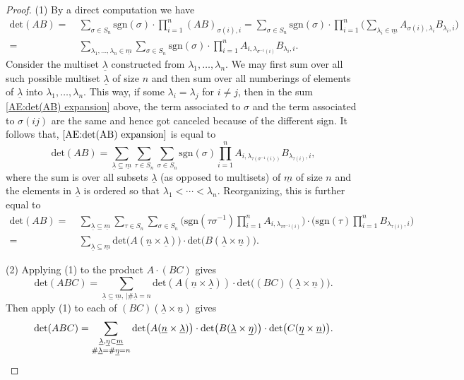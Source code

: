 \documentclass[12pt]{amsart}
\theoremstyle{definition}
\numberwithin{equation}{subsection}
\renewcommand{\det}{\mathrm{det}}
\newcommand{\sgn}{\mathrm{sgn}}
\begin{document}
\begin{proof}
(1) 
By a direct computation we have 
\begin{align}
\nonumber
\det(AB)=\ & \sum_{\sigma\in S_n}\sgn(\sigma)\cdot\prod_{i=1}^n (AB)_{\sigma(i),i}=\sum_{\sigma\in S_n}\sgn(\sigma)\cdot \prod_{i=1}^n\Big(\sum_{\lambda_i\in \underline m} A_{\sigma(i),\lambda_i}B_{\lambda_i,i} \Big)
\\
\label{AE:det(AB) expansion}
=\ & \sum_{\lambda_1, \dots, \lambda_n \in \underline m} \sum_{\sigma \in S_n} \sgn(\sigma)\cdot  \prod_{i=1}^nA_{i, \lambda_{\sigma^{-1}(i)}}B_{\lambda_i,i}.
\end{align}
Consider the multiset $\underline \lambda$ constructed from $\lambda_1, \dots, \lambda_n$. We may first sum over all such possible multiset $\underline \lambda$ of size $n$ and then sum over all numberings of elements of $\underline \lambda$ into $\lambda_1, \dots, \lambda_n$.  This way, if some $\lambda_i = \lambda_j$ for $i \neq j$, then in the sum \eqref{AE:det(AB) expansion} above, the term associated to $\sigma$ and the term associated to $\sigma(ij)$ are the same and hence got canceled because of the different sign.
It follows that, $\eqref{AE:det(AB) expansion}$ is equal to
$$
\det(AB) = \sum_{\underline\lambda \subseteq \underline m} \sum_{\tau \in S_n} \sum_{\sigma \in S_n} \sgn(\sigma)\prod_{i=1}^n A_{i, \lambda_{\tau(\sigma^{-1}(i))}} B_{\lambda_{\tau(i)},i},
$$
where the sum is over all subsets $\underline \lambda$ (as opposed to multisets) of $\underline m$ of size $n$ and the elements in $\underline \lambda$ is ordered so that $\lambda_1 < \cdots < \lambda_n$.  Reorganizing, this is further equal to
\begin{align*}
\det(AB) = \ &
\sum_{\underline\lambda\subseteq \underline m} \sum_{\tau \in S_n} \sum_{\sigma \in S_n} \Big(\sgn(\tau\sigma^{-1}) \prod_{i=1}^n A_{i, \lambda_{\tau\sigma^{-1}(i)}}\Big) \cdot \Big( \sgn(\tau)\prod_{i=1}^nB_{\lambda_{\tau(i)},i} \Big) \\
=\ & \sum_{\underline \lambda \subseteq \underline{m}}\det\big(A(\underline n \times \underline \lambda )\big) \cdot  \det\big(B(\underline \lambda \times \underline n)\big).
\end{align*}

(2) Applying  (1) to the product $A \cdot (BC)$ gives
$$
\det(ABC) = \sum_{\underline \lambda \subseteq \underline m, \, |\#\underline \lambda = n} \det(A(\underline n \times \underline \lambda)) \cdot \det \big( (BC)(\underline \lambda \times \underline n)\big).
$$
Then apply (1) to each of $(BC)(\underline \lambda \times \underline n)$ gives
$$
\det(ABC) =\sum_{\substack{\underline \lambda, \underline \eta \subset \underline m\\\#\underline \lambda= \#\underline \eta = n}} \det\big(A(\underline n \times \underline \lambda)\big) \cdot \det\big( B(\underline \lambda \times \underline \eta) \big) \cdot \det\big(C(\underline \eta\times \underline n)\big).
\qedhere $$
\end{proof}
\end{document}
